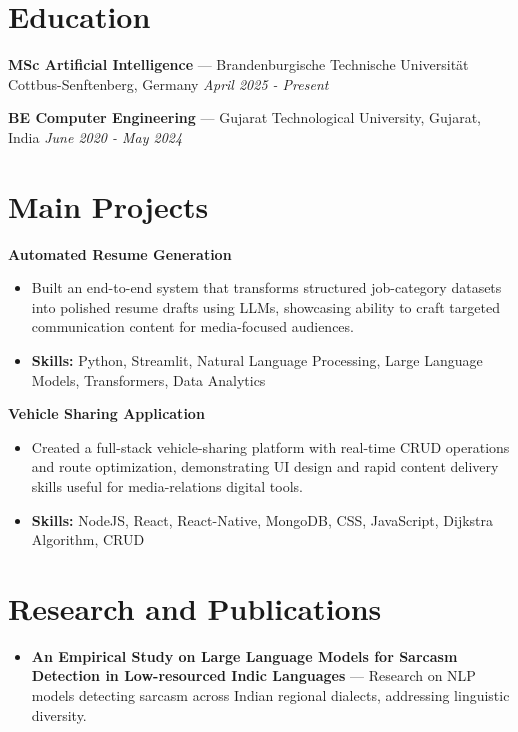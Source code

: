 \documentclass[a4paper,10pt]{article}
\begin{document}
\section*{Education}
\textbf{MSc Artificial Intelligence} — Brandenburgische Technische Universität Cottbus-Senftenberg, Germany \hfill \textit{April 2025 - Present}\par
\vspace{1.5pt}
\textbf{BE Computer Engineering} — Gujarat Technological University, Gujarat, India \hfill \textit{June 2020 - May 2024}\par

\section*{Main Projects}
\textbf{Automated Resume Generation}\par
\vspace{1pt}
\begin{itemize}
  \item Built an end-to-end system that transforms structured job-category datasets into polished resume drafts using LLMs, showcasing ability to craft targeted communication content for media-focused audiences.
  \item \textbf{Skills:} Python, Streamlit, Natural Language Processing, Large Language Models, Transformers, Data Analytics
\end{itemize}
\vspace{3pt}
\textbf{Vehicle Sharing Application}\par
\vspace{1pt}
\begin{itemize}
  \item Created a full-stack vehicle-sharing platform with real-time CRUD operations and route optimization, demonstrating UI design and rapid content delivery skills useful for media-relations digital tools.
  \item \textbf{Skills:} NodeJS, React, React-Native, MongoDB, CSS, JavaScript, Dijkstra Algorithm, CRUD
\end{itemize}

\section*{Research and Publications}
\begin{itemize}
\item \textbf{An Empirical Study on Large Language Models for Sarcasm Detection in Low-resourced Indic Languages} — Research on NLP models detecting sarcasm across Indian regional dialects, addressing linguistic diversity.
\end{itemize}
\end{document}

